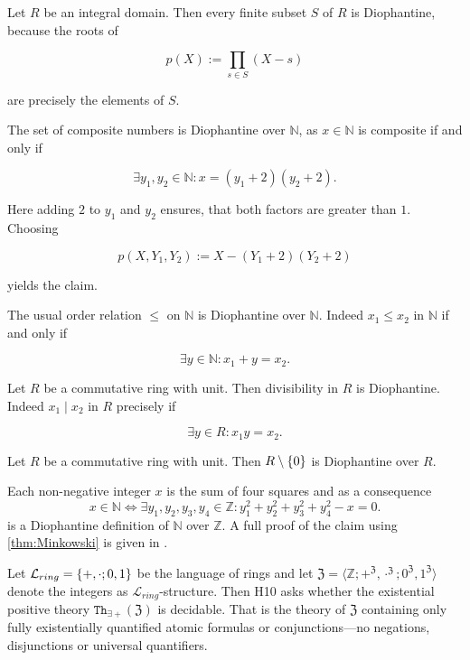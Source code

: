 \begin{exam}
  \begin{exlist}
    \item Let $R$ be an integral domain.
    Then every finite subset $S$ of $R$ is Diophantine, because the roots of

    \[ p(X) := \prod_{s ∈ S} (X - s) \]

    are precisely the elements of $S$.

    \item The set of composite numbers is Diophantine over $ℕ$, as $x ∈ ℕ$ is composite if and only if

    \[ ∃ y_1, y_2 ∈ ℕ : x = (y_1 + 2) (y_2 + 2). \]

    Here adding $2$ to $y_1$ and $y_2$ ensures, that both factors are greater than $1$.
    Choosing

    \[ p (X, Y_1, Y_2) := X - (Y_1 + 2)(Y_2 + 2) \]

    yields the claim.

    \item The usual order relation $≤$ on $ℕ$ is Diophantine over $ℕ$.
    Indeed $x_1 ≤ x_2$ in $ℕ$ if and only if

    \[ ∃ y ∈ ℕ : x_1 + y  = x_2. \]

    \item Let $R$ be a commutative ring with unit.
    Then divisibility in $R$ is Diophantine.
    Indeed $x_1 \mid x_2$ in $R$ precisely if

    \[ ∃ y ∈ R : x_1 y = x_2. \]

    \item Let $R$ be a commutative ring with unit. Then $R \setminus \left\lbrace 0 \right\rbrace$ is
    Diophantine over $R$.
    \item \label{ex:N is Diophantine over Z}
    Each non-negative integer $x$ is the sum of four squares and as a consequence
    \[
      x ∈ ℕ ⇔ ∃y_1,y_2,y_3,y_4∈ℤ: y_1^2 + y_2^2 + y_3^2 + y_4^2 - x = 0.
    \]
    is a Diophantine definition of $ℕ$ over $ℤ$. A full proof of the claim using \cref{thm:Minkowski} is given in \cite[Remark 4.20]{Milne2017}.
  \end{exlist}
\end{exam}

Let $\mathcal{L}_{ring} = \left\lbrace +,\cdot; 0, 1 \right\rbrace$ be the language of rings and
let $\mathfrak{Z} = ⟨ℤ; +^\mathfrak{Z}, \cdot^\mathfrak{Z};
0^\mathfrak{Z}, 1^\mathfrak{Z}⟩$ denote the integers as
$\mathcal{L}_{ring}$-structure. Then \textsc{H10} asks whether the existential
positive theory $\mathtt{Th}_{∃+}(\mathfrak{Z})$ is decidable. That is the
theory of $\mathfrak{Z}$ containing only fully existentially quantified atomic
formulas or conjunctions---no negations, disjunctions or universal quantifiers.

